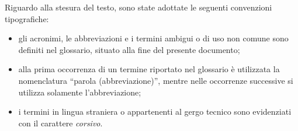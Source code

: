 Riguardo alla stesura del testo, sono state adottate le seguenti convenzioni
tipografiche:
\begin{itemize}
      \item gli acronimi, le abbreviazioni e i termini ambigui o di uso non
            comune sono definiti nel glossario, situato alla fine del presente
            documento;
      \item alla prima occorrenza di un termine riportato nel glossario è
            utilizzata la nomenclatura ``parola (abbreviazione)'', mentre
            nelle occorrenze successive si utilizza solamente l'abbreviazione;
      \item i termini in lingua straniera o appartenenti al gergo tecnico
            sono evidenziati con il carattere \emph{corsivo}.
\end{itemize}
